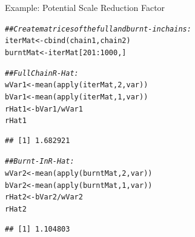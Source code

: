\documentclass{beamer}\usepackage[]{graphicx}\usepackage[]{color}
\makeatletter
\newcommand{\hlnum}[1]{\textcolor[rgb]{0.69,0.494,0}{#1}}%
\newcommand{\hlcom}[1]{\textcolor[rgb]{0.514,0.506,0.514}{\textit{#1}}}%
\newcommand{\hlopt}[1]{\textcolor[rgb]{0,0,0}{#1}}%
\newcommand{\hlstd}[1]{\textcolor[rgb]{0,0,0}{#1}}%
\newcommand{\hlkwb}[1]{\textcolor[rgb]{0,0.341,0.682}{#1}}%
\newcommand{\hlkwd}[1]{\textcolor[rgb]{0.004,0.004,0.506}{#1}}%
\newenvironment{kframe}{%
 \def\at@end@of@kframe{}%
 \ifinner\ifhmode%
  \def\at@end@of@kframe{\end{minipage}}%
  \begin{minipage}{\columnwidth}%
 \fi\fi%
 \def\FrameCommand##1{\hskip\@totalleftmargin \hskip-\fboxsep
 \colorbox{shadecolor}{##1}\hskip-\fboxsep
     \hskip-\linewidth \hskip-\@totalleftmargin \hskip\columnwidth}%
 \MakeFramed {\advance\hsize-\width
   \@totalleftmargin\z@ \linewidth\hsize
   \@setminipage}}%
 {\par\unskip\endMakeFramed%
 \at@end@of@kframe}
\newenvironment{knitrout}{}{} %
\makeatother
\begin{document}

\begin{frame}[fragile]{Example: Potential Scale Reduction Factor}
  
\begin{knitrout}\scriptsize
{}\color{fgcolor}\begin{kframe}
\begin{alltt}
\hlcom{## Create matrices of the full and burnt-in chains:}
\hlstd{iterMat}  \hlkwb{<-} \hlkwd{cbind}\hlstd{(chain1, chain2)}
\hlstd{burntMat} \hlkwb{<-} \hlstd{iterMat[}\hlnum{201} \hlopt{:} \hlnum{1000}\hlstd{, ]}

\hlcom{## Full Chain R-Hat:}
\hlstd{wVar1} \hlkwb{<-} \hlkwd{mean}\hlstd{(}\hlkwd{apply}\hlstd{(iterMat,} \hlnum{2}\hlstd{, var))}
\hlstd{bVar1} \hlkwb{<-} \hlkwd{mean}\hlstd{(}\hlkwd{apply}\hlstd{(iterMat,} \hlnum{1}\hlstd{, var))}
\hlstd{rHat1} \hlkwb{<-} \hlstd{bVar1} \hlopt{/} \hlstd{wVar1}
\hlstd{rHat1}
\end{alltt}
\begin{verbatim}
## [1] 1.682921
\end{verbatim}
\begin{alltt}
\hlcom{## Burnt-In R-Hat:}
\hlstd{wVar2} \hlkwb{<-} \hlkwd{mean}\hlstd{(}\hlkwd{apply}\hlstd{(burntMat,} \hlnum{2}\hlstd{, var))}
\hlstd{bVar2} \hlkwb{<-} \hlkwd{mean}\hlstd{(}\hlkwd{apply}\hlstd{(burntMat,} \hlnum{1}\hlstd{, var))}
\hlstd{rHat2} \hlkwb{<-} \hlstd{bVar2} \hlopt{/} \hlstd{wVar2}
\hlstd{rHat2}
\end{alltt}
\begin{verbatim}
## [1] 1.104803
\end{verbatim}
\end{kframe}
\end{knitrout}

\end{frame}

\end{document}
